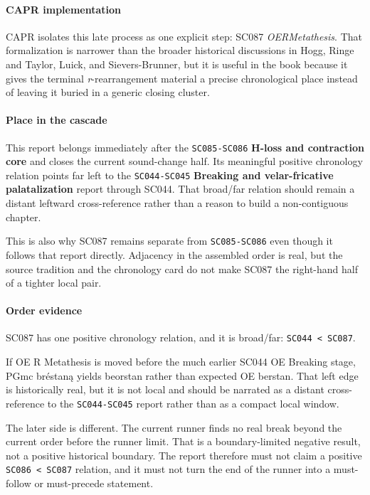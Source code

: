 \documentclass[
  british,
  a4paper,
]{article}
\begin{document}
\paragraph{CAPR implementation}\label{capr-implementation-52}

CAPR isolates this late process as one explicit step: SC087
\emph{OERMetathesis}. That formalization is narrower than the broader
historical discussions in Hogg, Ringe and Taylor, Luick, and
Sievers-Brunner, but it is useful in the book because it gives the
terminal \emph{r}-rearrangement material a precise chronological place
instead of leaving it buried in a generic closing cluster.

\paragraph{Place in the cascade}\label{place-in-the-cascade-52}

This report belongs immediately after the \texttt{SC085-SC086}
\textbf{H-loss and contraction core} and closes the current sound-change
half. Its meaningful positive chronology relation points far left to the
\texttt{SC044-SC045} \textbf{Breaking and velar-fricative
palatalization} report through SC044. That broad/far relation should
remain a distant leftward cross-reference rather than a reason to build
a non-contiguous chapter.

This is also why SC087 remains separate from \texttt{SC085-SC086} even
though it follows that report directly. Adjacency in the assembled order
is real, but the source tradition and the chronology card do not make
SC087 the right-hand half of a tighter local pair.

\paragraph{Order evidence}\label{order-evidence-52}

SC087 has one positive chronology relation, and it is broad/far:
\texttt{SC044\ \textless{}\ SC087}.

If OE R Metathesis is moved before the much earlier SC044 OE Breaking
stage, PGmc bréstaną yields beorstan rather than expected OE berstan.
That left edge is historically real, but it is not local and should be
narrated as a distant cross-reference to the \texttt{SC044-SC045} report
rather than as a compact local window.

The later side is different. The current runner finds no real break
beyond the current order before the runner limit. That is a
boundary-limited negative result, not a positive historical boundary.
The report therefore must not claim a positive
\texttt{SC086\ \textless{}\ SC087} relation, and it must not turn the
end of the runner into a must-follow or must-precede statement.
\end{document}
